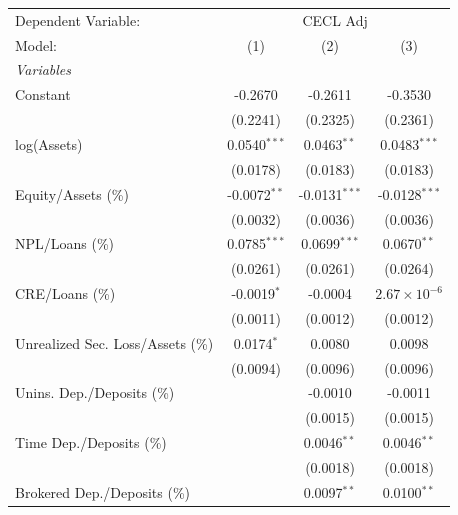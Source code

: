 
\begingroup
\centering
\begin{tabular}{lccc}
   \tabularnewline \midrule \midrule
   Dependent Variable: & \multicolumn{3}{c}{CECL Adj}\\
   Model:                            & (1)            & (2)             & (3)\\  
   \midrule
   \emph{Variables}\\
   Constant                          & -0.2670        & -0.2611         & -0.3530\\   
                                     & (0.2241)       & (0.2325)        & (0.2361)\\   
   log(Assets)                       & 0.0540$^{***}$ & 0.0463$^{**}$   & 0.0483$^{***}$\\   
                                     & (0.0178)       & (0.0183)        & (0.0183)\\   
   Equity/Assets (\%)                & -0.0072$^{**}$ & -0.0131$^{***}$ & -0.0128$^{***}$\\   
                                     & (0.0032)       & (0.0036)        & (0.0036)\\   
   NPL/Loans (\%)                    & 0.0785$^{***}$ & 0.0699$^{***}$  & 0.0670$^{**}$\\   
                                     & (0.0261)       & (0.0261)        & (0.0264)\\   
   CRE/Loans (\%)                    & -0.0019$^{*}$  & -0.0004         & $2.67\times 10^{-6}$\\    
                                     & (0.0011)       & (0.0012)        & (0.0012)\\   
   Unrealized Sec. Loss/Assets (\%)  & 0.0174$^{*}$   & 0.0080          & 0.0098\\   
                                     & (0.0094)       & (0.0096)        & (0.0096)\\   
   Unins. Dep./Deposits (\%)         &                & -0.0010         & -0.0011\\   
                                     &                & (0.0015)        & (0.0015)\\   
   Time Dep./Deposits (\%)           &                & 0.0046$^{**}$   & 0.0046$^{**}$\\   
                                     &                & (0.0018)        & (0.0018)\\   
   Brokered Dep./Deposits (\%)       &                & 0.0097$^{**}$   & 0.0100$^{**}$\\   

\end{tabular}

